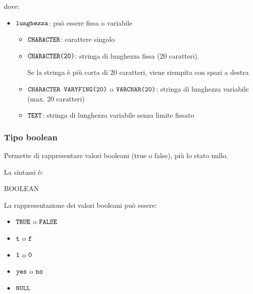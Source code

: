   dove:
  \begin{itemize}[label=$\triangleright$]
    \item $\verb|lunghezza|$: può essere fissa o variabile
    \begin{itemize}[label=$\diamond$, itemsep=\medskipamount]
      \item $\verb|CHARACTER|$: carattere singolo
      \item $\verb|CHARACTER(20)|$: stringa di lunghezza fissa (20 caratteri).
      
      Se la stringa è più corta di 20 caratteri, viene riempita con spazi a destra
      \item $\verb|CHARACTER VARYFING(20)|$ o $\verb|VARCHAR(20)|$: stringa di lunghezza variabile (max. 20 caratteri)
      \item $\verb|TEXT|$: stringa di lunghezza variabile senza limite fissato
    \end{itemize}
  \end{itemize}

  \subsubsection{Tipo boolean}
  Permette di rappresentare valori booleani (true o false), più lo stato nullo.
  
  La sintassi è:
  \begin{sqlcode}
    BOOLEAN
  \end{sqlcode}

  La rappresentazione dei valori booleani può essere:
  \begin{itemize}[label=$\circ$, itemsep=\smallskipamount]
    \item $\verb|TRUE|$ o $\verb|FALSE|$
    \item $\verb|t|$ o $\verb|f|$
    \item $\verb|1|$ o $\verb|0|$
    \item $\verb|yes|$ o $\verb|no|$
    \item $\verb|NULL|$
  \end{itemize}

